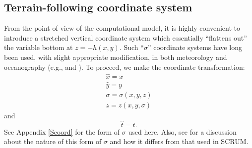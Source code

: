 \subsection{Terrain-following coordinate system}
From the point of view of the computational model, it is highly
convenient to introduce a stretched vertical coordinate system which
essentially ``flattens out'' the variable bottom at $z = -h(x,y)$.
Such ``$\sigma$'' coordinate systems have long been used, with slight
appropriate modification, in both meteorology and oceanography
(e.g., \cite{Phil} and \cite{FHD}).
To proceed, we make the coordinate transformation:
\[\begin{array}{c}
  \hat{x} = x \\
  \hat{y} = y \\[1mm]
  \sigma = \sigma(x,y,z) \\[1mm]
  z = z(x,y,\sigma)
\end{array}\]
and
\[
  \hat{t} = t.
\]
See Appendix \ref{Scoord} for the form of $\sigma$ used here.
Also, see \cite{SS2005} for a
discussion about the nature of this form of $\sigma$ and how it
differs from that used in SCRUM.


